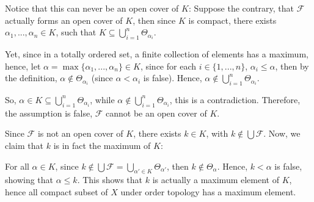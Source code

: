 \documentclass{article}
\begin{document}
\hfil

Notice that this can never be an open cover of $K$: Suppose the contrary, that $\mathcal{F}$ actually forms an open cover of $K$,
then since $K$ is compact, there exists $\alpha_1,...,\alpha_n\in K$, such that $K\subseteq \bigcup_{i=1}^{n}\Theta_{\alpha_i}$.

Yet, since in a totally ordered set, a finite collection of elements has a maximum, hence, let $\alpha=\max\{\alpha_1,...,\alpha_n\} \in K$, 
since for each $i\in\{1,...,n\}$, $\alpha_i\leq \alpha$, then by the definition, $\alpha\notin \Theta_{\alpha_i}$ (since $\alpha<\alpha_i$ is false).
Hence, $\alpha\notin \bigcup_{i=1}^{n}\Theta_{\alpha_i}$.

So, $\alpha\in K\subseteq \bigcup_{i=1}^{n}\Theta_{\alpha_i}$, while $\alpha\notin \bigcup_{i=1}^{n}\Theta_{\alpha_i}$, this is a contradiction. Therefore, the assumption is false,
$\mathcal{F}$ cannot be an open cover of $K$.

\hfil

Since $\mathcal{F}$ is not an open cover of $K$, there exists $k\in K$, with $k\notin \bigcup \mathcal{F}$. Now, we claim that $k$ is in fact the maximum of $K$:

For all $\alpha\in K$, since $k\notin \bigcup\mathcal{F}=\bigcup_{\alpha'\in K}\Theta_{\alpha'}$, then $k\notin \Theta_\alpha$.
Hence, $k<\alpha$ is false, showing that $\alpha\leq k$.
This shows that $k$ is actually a maximum element of $K$, hence all compact subset of $X$ under order topology has a maximum element.
\end{document}
